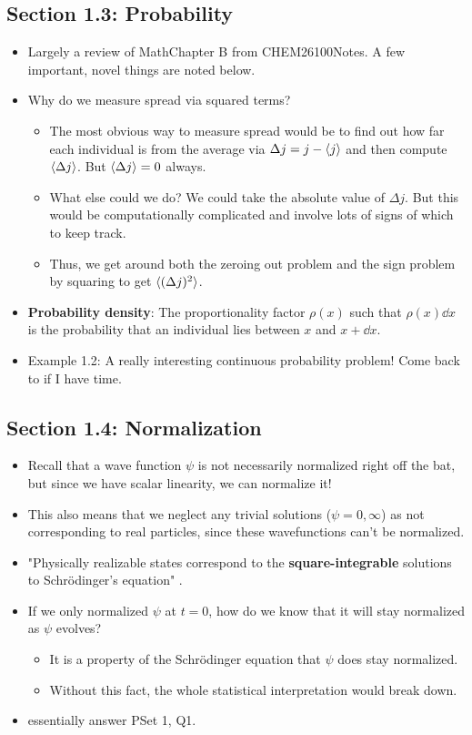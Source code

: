 \documentclass[../notes.tex]{subfiles}
\begin{document}
\subsection*{Section 1.3: Probability}
\begin{itemize}
    \item Largely a review of MathChapter B from CHEM26100Notes. A few important, novel things are noted below.
    \item Why do we measure spread via squared terms?
    \begin{itemize}
        \item The most obvious way to measure spread would be to find out how far each individual is from the average via $\Delta j=j-\langle{j}\rangle$ and then compute $\langle{\Delta j}\rangle$. But $\langle{\Delta j}\rangle=0$ always.
        \item What else could we do? We could take the absolute value of $\Delta j$. But this would be computationally complicated and involve lots of signs of which to keep track.
        \item Thus, we get around both the zeroing out problem and the sign problem by squaring to get $\langle{(\Delta j)^2}\rangle$.
    \end{itemize}
    \item \textbf{Probability density}: The proportionality factor $\rho(x)$ such that $\rho(x)\dd{x}$ is the probability that an individual lies between $x$ and $x+\dd{x}$.
    \item Example 1.2: A really interesting continuous probability problem! Come back to if I have time.
\end{itemize}


\subsection*{Section 1.4: Normalization}
\begin{itemize}
    \item Recall that a wave function $\psi$ is not necessarily normalized right off the bat, but since we have scalar linearity, we can normalize it!
    \item This also means that we neglect any trivial solutions ($\psi=0,\infty$) as not corresponding to real particles, since these wavefunctions can't be normalized.
    \item "Physically realizable states correspond to the \textbf{square-integrable} solutions to Schr\"{o}dinger's equation" \parencite[29]{bib:Griffiths}.
    \item If we only normalized $\psi$ at $t=0$, how do we know that it will stay normalized as $\psi$ evolves?
    \begin{itemize}
        \item It is a property of the Schr\"{o}dinger equation that $\psi$ does stay normalized.
        \item Without this fact, the whole statistical interpretation would break down.
    \end{itemize}
    \item \textcite{bib:Griffiths} essentially answer PSet 1, Q1.
\end{itemize}
\end{document}
